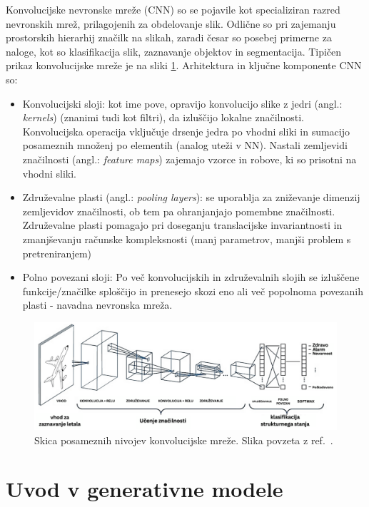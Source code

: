 \documentclass[12pt, a4paper]{article}
\begin{document}
Konvolucijske nevronske mreže (CNN) so se pojavile kot specializiran razred nevronskih mrež, prilagojenih za obdelovanje slik. Odlične so pri zajemanju prostorskih hierarhij značilk na slikah, zaradi česar so posebej primerne za naloge, kot so klasifikacija slik, zaznavanje objektov in segmentacija. Tipičen prikaz konvolucijske mreže je na sliki \ref{fig:CNN}.
Arhitektura in ključne komponente CNN so:
\begin{itemize}
	\item Konvolucijski sloji: kot ime pove, opravijo konvolucijo slike z jedri (angl.: \textit{kernels}) (znanimi tudi kot filtri), da izluščijo lokalne značilnosti. Konvolucijska operacija vključuje drsenje jedra po vhodni sliki in sumacijo posameznih množenj po elementih (analog uteži v NN). Nastali zemljevidi značilnosti (angl.: \textit{feature maps}) zajemajo vzorce in robove, ki so prisotni na vhodni sliki.
	\item Združevalne plasti (angl.: \textit{pooling layers}): se uporablja za zniževanje dimenzij zemljevidov značilnosti, ob tem pa ohranjanjajo pomembne značilnosti. Združevalne plasti pomagajo pri doseganju translacijske invariantnosti in zmanjševanju računske kompleksnosti (manj parametrov, manjši problem s pretreniranjem)
	\item Polno povezani sloji: Po več konvolucijskih in združevalnih slojih se izluščene funkcije/značilke sploščijo in prenesejo skozi eno ali več popolnoma povezanih plasti - navadna nevronska mreža.
\end{itemize}

\begin{figure}[htb!]
        \centering
        \includegraphics[width=0.7\linewidth]{Images_SLO/CNN2_SLO.png}
        \caption{Skica posameznih nivojev konvolucijske mreže. Slika povzeta z ref.~\cite{CNNim}.}
        \label{fig:CNN}
\end{figure}



\newpage
\section{Uvod v generativne modele}
\end{document}
